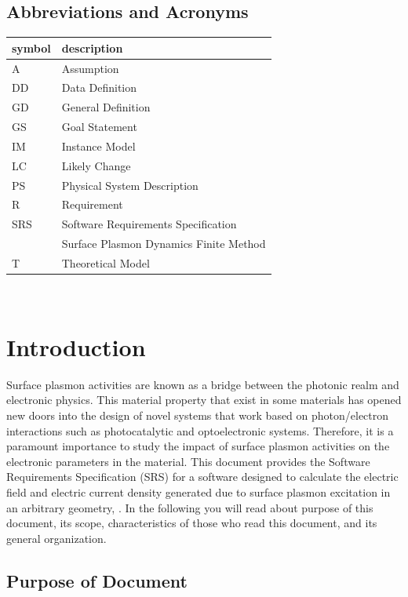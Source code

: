 \documentclass[12pt]{article}
\begin{document}
	
	\subsection{Abbreviations and Acronyms}
	
	\renewcommand{\arraystretch}{1.2} \begin{tabular}{l l} \toprule \textbf{symbol}
		& \textbf{description}\\ \midrule A & Assumption\\ DD & Data Definition\\ GD &
		General Definition\\ GS & Goal Statement\\ IM & Instance Model\\ LC & Likely
		Change\\ PS & Physical System Description\\ R & Requirement\\ SRS & Software
		Requirements Specification\\ \progname{} & Surface Plasmon Dynamics Finite
		Method\\ T & Theoretical Model\\ \bottomrule \end{tabular}\\
	
	
	\newpage
	
	
	\section{Introduction}
	
	Surface plasmon activities are known as a bridge between the photonic realm and
	electronic physics. This material property that exist in some materials has
	opened new doors into the design of novel systems that work based on
	photon/electron interactions such as photocatalytic and optoelectronic systems.
	Therefore, it is a paramount importance to study the impact of surface plasmon
	activities on the electronic parameters in the material. This document provides
	the Software Requirements Specification (SRS) for a software designed to
	calculate the electric field and electric current density generated due to
	surface plasmon excitation in an arbitrary geometry, \progname{}. In the following you will read about purpose of this document, its scope, characteristics of those who read this document, and its general organization.
	
	
	\subsection{Purpose of Document}
	
\end{document}
